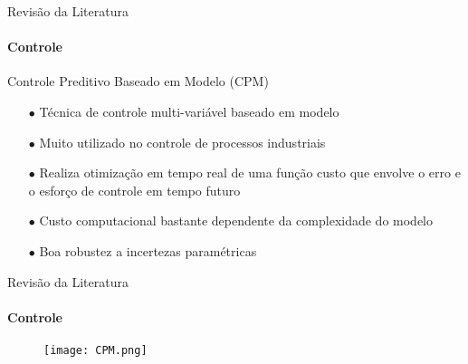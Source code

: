 \documentclass[25pt,landscape]{beamer}
\begin{document}
\begin{frame}{Revisão da Literatura}
    \framesubtitle{Controle}
    \begin{block}{Controle Preditivo Baseado em Modelo (CPM)}
        \begin{itemize}
            \item[$\bullet$] Técnica de controle multi-variável baseado em modelo \\[8pt]
            \item[$\bullet$] Muito utilizado no controle de processos industriais \\[8pt]
            \item[$\bullet$] Realiza otimização em tempo real de uma função custo que envolve o erro e o esforço de controle em tempo futuro \\[8pt]
            \item[$\bullet$] Custo computacional bastante dependente da complexidade do modelo \\[8pt]
            \item[$\bullet$] Boa robustez a incertezas paramétricas  \\[8pt]
        \end{itemize}
    \end{block}
\end{frame}

\begin{frame}{Revisão da Literatura}
    \framesubtitle{Controle}
    \begin{figure}[!h]
        \centering
        \texttt{[image: CPM.png]}
    \end{figure}  
\end{frame}
\end{document}
